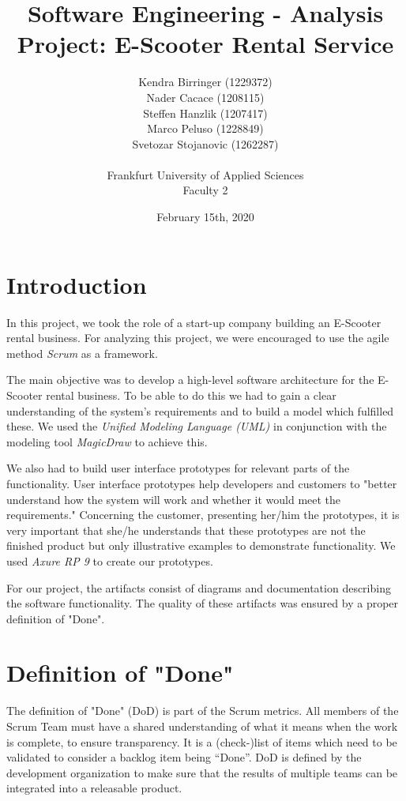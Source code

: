 \documentclass[a4paper, 12pt]{article}
\title{Software Engineering - Analysis\\
Project: E-Scooter Rental Service}
\author{
    Kendra Birringer (1229372)\\
    Nader Cacace (1208115)\\
    Steffen Hanzlik (1207417)\\
    Marco Peluso (1228849)\\
    Svetozar Stojanovic (1262287)\\
    \\
    Frankfurt University of Applied Sciences
    \\ Faculty 2
}
\date{February 15th, 2020}
\begin{document}
\maketitle
\newpage
\tableofcontents

\newpage
\section{Introduction}
In this project, we took the role of a start-up company building an E-Scooter rental business.
For analyzing this project, we were encouraged to use the agile method \emph{Scrum} \cite{scrum} as a framework.

The main objective was to develop a high-level software architecture for the E-Scooter rental business. To be able to do this we had to gain a clear understanding of the system's requirements and to build a model which fulfilled these. We used the \emph{Unified Modeling Language (UML)} \cite{uml} in conjunction with the modeling tool \emph{MagicDraw} \cite{magicdraw} to achieve this.

We also had to build user interface prototypes for relevant parts of the functionality. User interface prototypes help developers and customers to "better understand how the system will work and whether it would meet the requirements." \cite{thoma} Concerning the customer, presenting her/him the prototypes, it is very important that she/he understands that these prototypes are not the finished product but only illustrative examples to demonstrate functionality. We used \emph{Axure RP 9} \cite{axure} to create our prototypes.

For our project, the artifacts consist of diagrams and documentation describing the software functionality. The quality of these artifacts was ensured by a proper definition of "Done".

\section{Definition of "Done"}
The definition of "Done" (DoD) is part of the Scrum metrics. All members of the Scrum Team must have a shared understanding of what it means when the work is complete, to ensure transparency. \cite{scrumguide}
It is a (check-)list of items which need to be validated to consider a backlog item being “Done”. DoD is defined by the development organization to make sure that the results of multiple teams can be integrated into a releasable product. \cite{thoma1}
\end{document}
